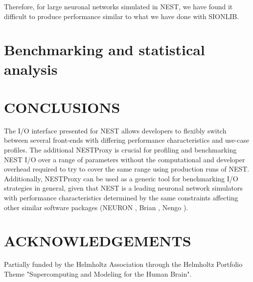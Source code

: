 \documentclass[]{YIC2015}
\begin{document}
Therefore, for large neuronal networks simulated in NEST, we have
found it difficult to produce performance similar to what we have done
with SIONLIB. 

\section{Benchmarking and statistical analysis}


\section{CONCLUSIONS}
The I/O interface presented for NEST allows developers to flexibly
switch between several front-ends with differing performance
characteristics and use-case profiles. The additional NESTProxy is
crucial for profiling and benchmarking NEST I/O over a range of
parameters without the computational and developer overhead required
to try to cover the same range using production runs of
NEST. Additionally, NESTProxy can be used as a generic tool for
benchmarking I/O strategies in general, given that NEST is a leading
neuronal network simulators with performance characteristics
determined by the same constraints affecting other similar software
packages (NEURON \cite{neuron}, Brian \cite{brian}, Nengo \cite{nengo}).

\section*{ACKNOWLEDGEMENTS}
Partially funded by the Helmholtz Association through the Helmholtz Portfolio Theme "Supercomputing and Modeling for the Human Brain".
\end{document}
